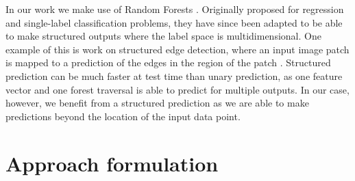 \documentclass[10pt,twocolumn,letterpaper]{article}
\begin{document}
In our work we make use of Random Forests \cite{breiman-ml-2001}.
Originally proposed for regression and single-label classification problems, they have since been adapted to be able to make structured outputs where the label space is multidimensional.
One example of this is work on structured edge detection, where an input image patch is mapped to a prediction of the edges in the region of the patch \cite{dollar-iccv-2013}.
Structured prediction can be much faster at test time than unary prediction, as one feature vector and one forest traversal is able to predict for multiple outputs.
In our case, however, we benefit from a structured prediction as we are able to make predictions beyond the location of the input data point.




\section{Approach formulation}
\end{document}
